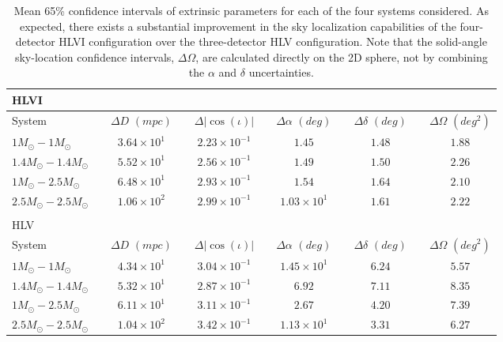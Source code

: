 \documentclass[11pt,a4paper]{emulateapj} 
\begin{document}
 
\begin{table}[t!]
\centering
\caption{Mean 65\% confidence intervals of extrinsic parameters for
  each of the four systems considered.  As expected, there exists a
  substantial improvement in the sky localization capabilities of the
  four-detector HLVI configuration over the three-detector HLV
  configuration.  Note that the solid-angle sky-location confidence
  intervals, $\Delta\Omega$, are calculated directly on the 2D sphere,
  not by combining the $\alpha$ and $\delta$ uncertainties.}
\begin{tabular}{lcccccccccc}

\\HLVI\\ \hline\hline System & \vline & $\Delta D$ $(mpc)$ & \vline &
$\Delta |\cos(\iota)|$ & \vline & $\Delta \alpha$ $(deg)$& \vline &
$\Delta \delta$ $(deg)$ & \vline & $\Delta\Omega$
$(deg^2)$\\ \hline\hline $1M_{\odot}-1M_{\odot}$ & \vline &
$3.64\times 10^{1}$ & \vline & $2.23\times 10^{-1}$ & \vline & $1.45$
& \vline & $1.48$ & \vline & $1.88$\\ \hline
$1.4M_{\odot}-1.4M_{\odot}$ & \vline & $5.52\times 10^{1}$ & \vline &
$2.56\times 10^{-1}$ & \vline & $1.49$ & \vline & $1.50$ & \vline &
$2.26$\\ \hline $1M_{\odot}-2.5M_{\odot}$ & \vline & $6.48\times
10^{1}$ & \vline & $2.93\times 10^{-1}$ & \vline & $1.54$ & \vline &
$1.64$ & \vline & $2.10$\\ \hline $2.5M_{\odot}-2.5M_{\odot}$ & \vline
& $1.06\times 10^{2}$ & \vline & $2.99\times 10^{-1}$ & \vline &
$1.03\times 10^{1}$ & \vline & $1.61$ & \vline & $2.22$\\ \hline\hline

\\ HLV\\

\hline\hline System & \vline & $\Delta D$ $(mpc)$ & \vline & $\Delta
|\cos(\iota)|$ & \vline & $\Delta \alpha$ $(deg)$& \vline & $\Delta
\delta$ $(deg)$ & \vline & $\Delta\Omega$ $(deg^2)$\\ \hline\hline
$1M_{\odot}-1M_{\odot}$ & \vline & $4.34\times 10^{1}$ & \vline &
$3.04\times 10^{-1}$ & \vline & $1.45\times 10^{1}$ & \vline & $6.24$
& \vline & $5.57$\\ \hline $1.4M_{\odot}-1.4M_{\odot}$ & \vline &
$5.32\times 10^{1}$ & \vline & $2.87\times 10^{-1}$ & \vline & $6.92$
& \vline & $7.11$ & \vline & $8.35$\\ \hline
$1M_{\odot}-2.5M_{\odot}$& \vline & $6.11\times 10^{1}$ & \vline &
$3.11\times 10^{-1}$ & \vline & $2.67$ & \vline & $4.20$ & \vline &
$7.39$\\ \hline $2.5M_{\odot}-2.5M_{\odot}$ & \vline & $1.04\times
10^{2}$ & \vline & $3.42\times 10^{-1}$ & \vline & $1.13\times 10^{1}$
& \vline & $3.31$ & \vline & $6.27$\\ \hline\hline


\end{tabular}
\label{ciTableExtrinsic}
\end{table}
\end{document}
